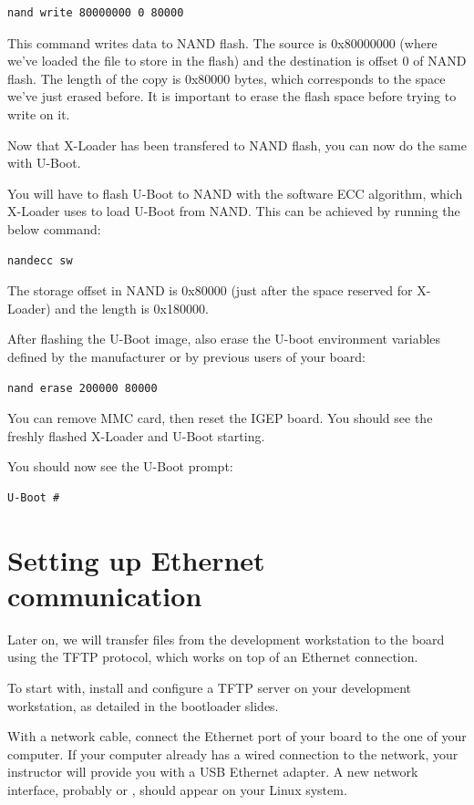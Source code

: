 \begin{verbatim}
nand write 80000000 0 80000
\end{verbatim}

This command writes data to NAND flash. The source is 0x80000000
(where we've loaded the file to store in the flash) and the
destination is offset 0 of NAND flash. The length of the copy is
0x80000 bytes, which corresponds to the space we've just erased
before. It is important to erase the flash space before trying to
write on it.

Now that X-Loader has been transfered to NAND flash, you can now do the same
with U-Boot. 

You will have to flash U-Boot to NAND with the software ECC algorithm, which
X-Loader uses to load U-Boot from NAND. This can be achieved by
running the below command:

\begin{verbatim}
nandecc sw
\end{verbatim}

The storage offset in NAND is 0x80000 (just after
the space reserved for X-Loader) and the length is 0x180000.

After flashing the U-Boot image, also erase the U-boot environment
variables defined by the manufacturer or by previous users of your
board:

\begin{verbatim}
nand erase 200000 80000
\end{verbatim}

You can remove MMC card, then reset the IGEP board. You should see the
freshly flashed X-Loader and U-Boot starting.

You should now see the U-Boot prompt:

\begin{verbatim}
U-Boot #
\end{verbatim}

\section{Setting up Ethernet communication}

Later on, we will transfer files from the development workstation to
the board using the TFTP protocol, which works on top of an Ethernet
connection.

To start with, install and configure a TFTP server on your development
workstation, as detailed in the bootloader slides.

With a network cable, connect the Ethernet port of your board to the
one of your computer. If your computer already has a wired connection
to the network, your instructor will provide you with a USB Ethernet
adapter. A new network interface, probably  or ,
should appear on your Linux system.


